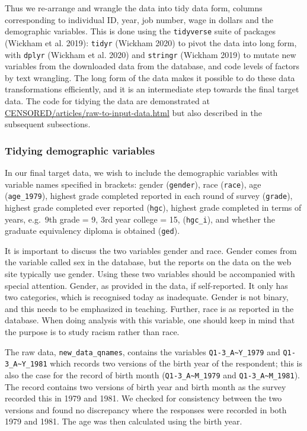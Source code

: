 \documentclass{article}
\begin{document}
Thus we re-arrange and wrangle the data into tidy data form, columns corresponding to individual ID, year, job number, wage in dollars and the demographic variables. This is done using the \texttt{tidyverse} suite of packages (Wickham et al. 2019): \texttt{tidyr} (Wickham 2020) to pivot the data into long form, with \texttt{dplyr} (Wickham et al. 2020) and \texttt{stringr} (Wickham 2019) to mutate new variables from the downloaded data from the database, and code levels of factors by text wrangling. The long form of the data makes it possible to do these data transformations efficiently, and it is an intermediate step towards the final target data. The code for tidying the data are demonstrated at \url{CENSORED/articles/raw-to-input-data.html} but also described in the subsequent subsections.

\hypertarget{tidydemog}{%
\subsubsection{Tidying demographic variables}\label{tidydemog}}

In our final target data, we wish to include the demographic variables with variable names specified in brackets: gender (\texttt{gender}), race (\texttt{race}), age (\texttt{age\_1979}), highest grade completed reported in each round of survey (\texttt{grade}), highest grade completed ever reported (\texttt{hgc}), highest grade completed in terms of years, e.g.~9th grade = 9, 3rd year college = 15, (\texttt{hgc\_i}), and whether the graduate equivalency diploma is obtained (\texttt{ged}).

It is important to discuss the two variables gender and race. Gender comes from the variable called sex in the database, but the reports on the data on the web site typically use gender. Using these two variables should be accompanied with special attention. Gender, as provided in the data, if self-reported. It only has two categories, which is recognised today as inadequate. Gender is not binary, and this needs to be emphasized in teaching. Further, race is as reported in the database. When doing analysis with this variable, one should keep in mind that the purpose is to study racism rather than race.

The raw data, \texttt{new\_data\_qnames}, contains the variables \texttt{Q1-3\_A\textasciitilde{}Y\_1979} and \texttt{Q1-3\_A\textasciitilde{}Y\_1981} which records two versions of the birth year of the respondent; this is also the case for the record of birth month (\texttt{Q1-3\_A\textasciitilde{}M\_1979} and \texttt{Q1-3\_A\textasciitilde{}M\_1981}). The record contains two versions of birth year and birth month as the survey recorded this in 1979 and 1981. We checked for consistency between the two versions and found no discrepancy where the responses were recorded in both 1979 and 1981. The age was then calculated using the birth year.
\end{document}
